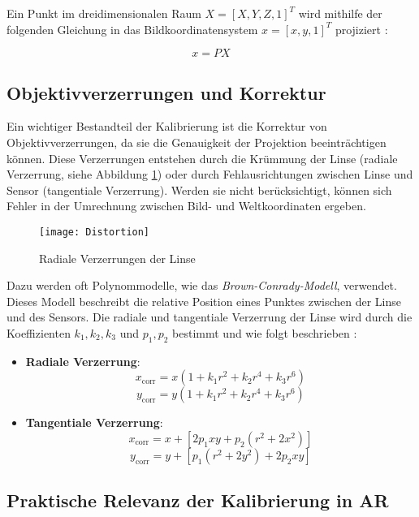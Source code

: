 Ein Punkt im dreidimensionalen Raum \( X = [X, Y, Z, 1]^T \) wird mithilfe der folgenden Gleichung in das Bildkoordinatensystem \( x = [x, y, 1]^T \) projiziert \cite{mw2024calibration}:

\[
x = PX
\]

\subsection{Objektivverzerrungen und Korrektur}

Ein wichtiger Bestandteil der Kalibrierung ist die Korrektur von Objektivverzerrungen, da sie die Genauigkeit der Projektion beeinträchtigen können. Diese Verzerrungen entstehen durch die Krümmung der Linse (radiale Verzerrung, siehe Abbildung \ref{fig:Distortion}) oder durch Fehlausrichtungen zwischen Linse und Sensor (tangentiale Verzerrung). Werden sie nicht berücksichtigt, können sich Fehler in der Umrechnung zwischen Bild- und Weltkoordinaten ergeben. \cite{mw2024calibration, szeliski2022computerVision}

\begin{figure}[ht]
    \centering
    \texttt{[image: Distortion]}
    \caption{Radiale Verzerrungen der Linse \cite{stachniss2021calibration}\label{fig:Distortion}}
\end{figure}

Dazu werden oft Polynommodelle, wie das \emph{Brown-Conrady-Modell}, verwendet. Dieses Modell beschreibt die relative Position eines Punktes zwischen der Linse und des Sensors. Die radiale und tangentiale Verzerrung der Linse wird durch die Koeffizienten \( k_1, k_2, k_3 \) und \( p_1, p_2 \) bestimmt \cite{brown1966distortion} und wie folgt beschrieben \cite{mw2024calibration, szeliski2022computerVision}:
\begin{itemize}
    \item \textbf{Radiale Verzerrung}:
    \[ x_{\text{corr}} = x \left( 1 + k_1 r^2 + k_2 r^4 + k_3 r^6 \right) \]
    \[ y_{\text{corr}} = y \left( 1 + k_1 r^2 + k_2 r^4 + k_3 r^6 \right) \]
    \item \textbf{Tangentiale Verzerrung}:
    \[ x_{\text{corr}} = x + [2p_1xy + p_2(r^2 + 2x^2)] \]
    \[ y_{\text{corr}} = y + [p_1(r^2 + 2y^2) + 2p_2xy] \]
\end{itemize}

\subsection{Praktische Relevanz der Kalibrierung in AR}

